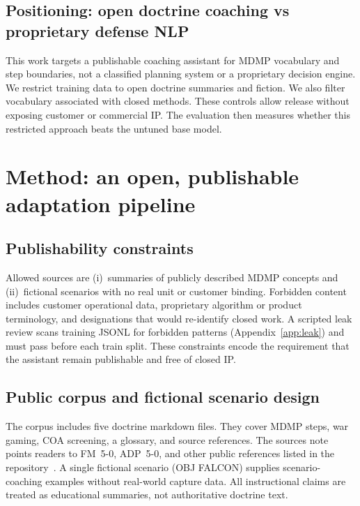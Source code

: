 \documentclass[11pt]{article}
\begin{document}
\subsection{Positioning: open doctrine coaching vs proprietary defense NLP}
\label{sec:related-position}

This work targets a publishable coaching assistant for MDMP vocabulary and
step boundaries, not a classified planning system or a proprietary decision
engine.
We restrict training data to open doctrine summaries and fiction.
We also filter vocabulary associated with closed methods.
These controls allow release without exposing customer or commercial IP.
The evaluation then measures whether this restricted approach beats the
untuned base model.

\section{Method: an open, publishable adaptation pipeline}
\label{sec:method}

\subsection{Publishability constraints}
\label{sec:method-constraints}

Allowed sources are (i)~summaries of publicly described MDMP concepts and
(ii)~fictional scenarios with no real unit or customer binding.
Forbidden content includes customer operational data, proprietary algorithm
or product terminology, and designations that would re-identify closed work.
A scripted leak review scans training JSONL for forbidden patterns
(Appendix~\ref{app:leak}) and must pass before each train split.
These constraints encode the requirement that the assistant remain publishable
and free of closed IP.

\subsection{Public corpus and fictional scenario design}
\label{sec:method-corpus}

The corpus includes five doctrine markdown files.
They cover MDMP steps, war gaming, COA screening, a glossary, and source
references.
The sources note points readers to \mbox{FM 5-0}, \mbox{ADP 5-0}, and other
public references listed in the repository~\citep{fm50,adp50}.
A single fictional scenario (OBJ FALCON) supplies scenario-coaching examples
without real-world capture data.
All instructional claims are treated as educational summaries, not
authoritative doctrine text.
\end{document}
